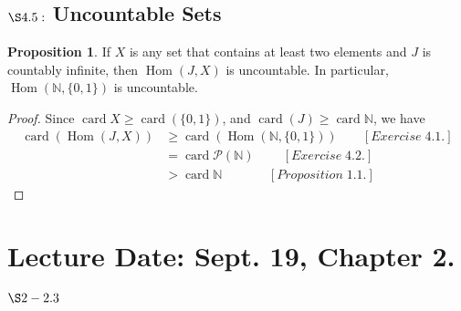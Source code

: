 \documentclass[9pt,reqno]{amsart}
\theoremstyle{definition}
\newtheorem{prop}{Proposition}[section]
\newcommand{\nn}{\mathbb N}
\DeclareMathOperator{\Hom}{Hom}
\DeclareMathOperator{\card}{card}
\begin{document}
\subsection{$\S 4.5:$ Uncountable Sets}
\begin{prop}
If $X$ is any set that contains at least two elements and $J$ is countably infinite, then $\Hom (J,X)$ is uncountable. In particular, $\Hom (\nn , \{0,1 \})$ is uncountable. 	
\end{prop}
\begin{proof}
	Since $\card X \geq \card ( \{0,1 \} )$, and $\card (J) \geq \card \nn$, we have 
	\begin{align*}
		\card (\Hom (J,X)) &\geq \card(\Hom (\nn, \{0,1 \} )) \; \; \; \; \; \; \; [Exercise\;  4.1.] \\
		&= \card \mathcal P (\nn) \; \; \; \; \; \; \; \;[Exercise\;  4.2.]  \\
		&> \card \nn \; \; \; \; \; \; \; \; \; \; \; \; \;[Proposition \; 1.1.]
	\end{align*}
\end{proof}
\section{Lecture Date: Sept. 19, Chapter 2. $\S 2 - 2.3$}
\end{document}
